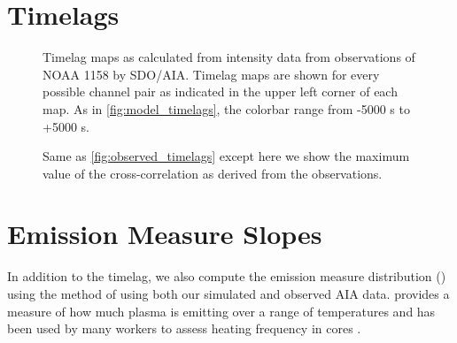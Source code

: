 \section{Timelags}\label{timelags}

\begin{figure*}
    \caption{Timelag maps as calculated from intensity data from observations of \AR{} NOAA 1158 by SDO/AIA. Timelag maps are shown for every possible channel pair as indicated in the upper left corner of each map. As in \autoref{fig:model_timelags}, the colorbar range from -5000 s to +5000 s.}
    \label{fig:observed_timelags}
\end{figure*}

\begin{figure*}
    \caption{Same as \autoref{fig:observed_timelags} except here we show the maximum value of the cross-correlation as derived from the observations.}
    \label{fig:observed_correlations}
\end{figure*}




\section{Emission Measure Slopes}\label{em_slopes}

In addition to the timelag, we also compute the emission measure distribution (\dem) using the method of \citet{hannah_differential_2012} using both our simulated and observed AIA data. \dem provides a measure of how much plasma is emitting over a range of temperatures and has been used by many workers to assess heating frequency in \AR{} cores \citep[][and references therein]{tripathi_emission_2011,warren_constraints_2011,warren_systematic_2012,schmelz_cold_2012,bradshaw_diagnosing_2012,reep_diagnosing_2013,barnes_inference_2016,barnes_inference_2016,barnes_inference_2016-1}. 

